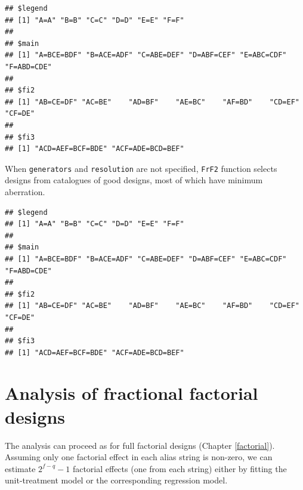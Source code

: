 \documentclass[
]{book}
\newenvironment{Shaded}{\begin{snugshade}}{\end{snugshade}}
\newcommand{\AttributeTok}[1]{\textcolor[rgb]{0.77,0.63,0.00}{#1}}
\newcommand{\DecValTok}[1]{\textcolor[rgb]{0.00,0.00,0.81}{#1}}
\newcommand{\FloatTok}[1]{\textcolor[rgb]{0.00,0.00,0.81}{#1}}
\newcommand{\FunctionTok}[1]{\textcolor[rgb]{0.00,0.00,0.00}{#1}}
\newcommand{\NormalTok}[1]{#1}
\newcommand{\OtherTok}[1]{\textcolor[rgb]{0.56,0.35,0.01}{#1}}
\newcommand{\SpecialCharTok}[1]{\textcolor[rgb]{0.00,0.00,0.00}{#1}}
\theoremstyle{definition}
\theoremstyle{definition}
\theoremstyle{definition}
\theoremstyle{definition}
\theoremstyle{remark}
\begin{document}
\begin{verbatim}
## $legend
## [1] "A=A" "B=B" "C=C" "D=D" "E=E" "F=F"
## 
## $main
## [1] "A=BCE=BDF" "B=ACE=ADF" "C=ABE=DEF" "D=ABF=CEF" "E=ABC=CDF" "F=ABD=CDE"
## 
## $fi2
## [1] "AB=CE=DF" "AC=BE"    "AD=BF"    "AE=BC"    "AF=BD"    "CD=EF"    "CF=DE"   
## 
## $fi3
## [1] "ACD=AEF=BCF=BDE" "ACF=ADE=BCD=BEF"
\end{verbatim}

When \texttt{generators} and \texttt{resolution} are not specified, \texttt{FrF2} function selects designs from catalogues of good designs, most of which have minimum aberration.

\begin{Shaded}
\end{Shaded}

\begin{verbatim}
## $legend
## [1] "A=A" "B=B" "C=C" "D=D" "E=E" "F=F"
## 
## $main
## [1] "A=BCE=BDF" "B=ACE=ADF" "C=ABE=DEF" "D=ABF=CEF" "E=ABC=CDF" "F=ABD=CDE"
## 
## $fi2
## [1] "AB=CE=DF" "AC=BE"    "AD=BF"    "AE=BC"    "AF=BD"    "CD=EF"    "CF=DE"   
## 
## $fi3
## [1] "ACD=AEF=BCF=BDE" "ACF=ADE=BCD=BEF"
\end{verbatim}

\hypertarget{frac-anal}{%
\section{Analysis of fractional factorial designs}\label{frac-anal}}

The analysis can proceed as for full factorial designs (Chapter \ref{factorial}). Assuming only one factorial effect in each alias string is non-zero, we can estimate \(2^{f-q}-1\) factorial effects (one from each string) either by fitting the unit-treatment model or the corresponding regression model.
\end{document}
